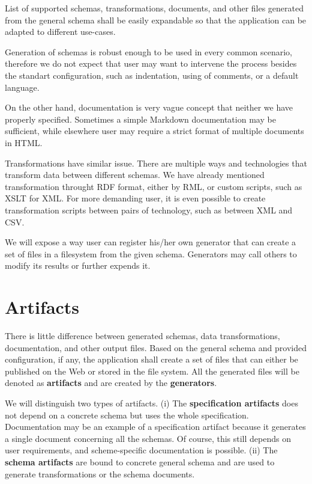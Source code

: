 \begin{requirement}
  List of supported schemas, transformations, documents, and other files generated from the general schema shall be easily expandable so that the application can be adapted to different use-cases.
\end{requirement}

Generation of schemas is robust enough to be used in every common scenario, therefore we do not expect that user may want to intervene the process besides the standart configuration, such as indentation, using of comments, or a default language.

On the other hand, documentation is very vague concept that neither we have properly specified. Sometimes a simple Markdown documentation may be sufficient, while elsewhere user may require a strict format of multiple documents in HTML.

Transformations have similar issue. There are multiple ways and technologies that transform data between different schemas. We have already mentioned transformation throught RDF format, either by RML, or custom scripts, such as XSLT for XML. For more demanding user, it is even possible to create transformation scripts between pairs of technology, such as between XML and CSV.

We will expose a way user can register his/her own generator that can create a set of files in a filesystem from the given schema. Generators may call others to modify its results or further expends it.

\section*{Artifacts}

There is little difference between generated schemas, data transformations, documentation, and other output files. Based on the general schema and provided configuration, if any, the application shall create a set of files that can either be published on the Web or stored in the file system. All the generated files will be denoted as \textbf{artifacts} and are created by the \textbf{generators}.

We will distinguish two types of artifacts. (i) The \textbf{specification artifacts} does not depend on a concrete schema but uses the whole specification. Documentation may be an example of a specification artifact because it generates a single document concerning all the schemas. Of course, this still depends on user requirements, and scheme-specific documentation is possible. (ii) The \textbf{schema artifacts} are bound to concrete general schema and are used to generate transformations or the schema documents.

